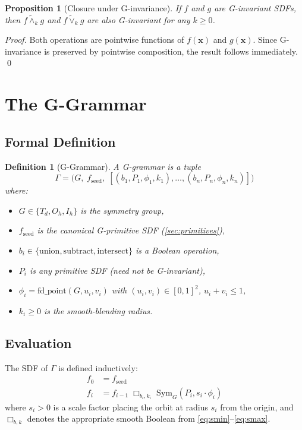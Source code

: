 \documentclass[11pt, a4paper]{article}
\newtheorem{definition}{Definition}[section]
\newtheorem{proposition}{Proposition}[section]
\newcommand{\smin}{\mathbin{\tilde{\wedge}}}
\newcommand{\smax}{\mathbin{\tilde{\vee}}}
\newcommand{\Td}{T_d}
\newcommand{\Oh}{O_h}
\newcommand{\Ih}{I_h}
\begin{document}
\begin{proposition}[Closure under G-invariance]
If $f$ and $g$ are G-invariant SDFs, then $f \smin_k g$ and $f \smax_k g$
are also G-invariant for any $k \geq 0$.
\end{proposition}
\begin{proof}
Both operations are pointwise functions of $f(\mathbf{x})$ and $g(\mathbf{x})$.
Since G-invariance is preserved by pointwise composition, the result follows
immediately. \qed
\end{proof}

\section{The G-Grammar}
\label{sec:grammar}

\subsection{Formal Definition}

\begin{definition}[G-Grammar]
A \emph{G-grammar} is a tuple
\[
  \Gamma = \bigl(G,\; f_{\mathrm{seed}},\; [(b_1, P_1, \phi_1, k_1), \ldots, (b_n, P_n, \phi_n, k_n)]\bigr)
\]
where:
\begin{itemize}
  \item $G \in \{\Td, \Oh, \Ih\}$ is the symmetry group,
  \item $f_{\mathrm{seed}}$ is the canonical G-primitive SDF (\cref{sec:primitives}),
  \item $b_i \in \{\mathrm{union}, \mathrm{subtract}, \mathrm{intersect}\}$ is a Boolean operation,
  \item $P_i$ is any primitive SDF (need not be G-invariant),
  \item $\phi_i = \mathrm{fd\_point}(G, u_i, v_i)$ with $(u_i, v_i) \in [0,1]^2$, $u_i+v_i\leq 1$,
  \item $k_i \geq 0$ is the smooth-blending radius.
\end{itemize}
\end{definition}

\subsection{Evaluation}

The SDF of $\Gamma$ is defined inductively:
\begin{align}
  f_0 &= f_{\mathrm{seed}} \\
  f_i &= f_{i-1} \;\Box_{b_i, k_i}\; \mathrm{Sym}_G(P_i, s_i \cdot \phi_i)
  \label{eq:eval}
\end{align}
where $s_i > 0$ is a scale factor placing the orbit at radius $s_i$ from the
origin, and $\Box_{b,k}$ denotes the appropriate smooth Boolean from
\cref{eq:smin}--\cref{eq:smax}.
\end{document}
